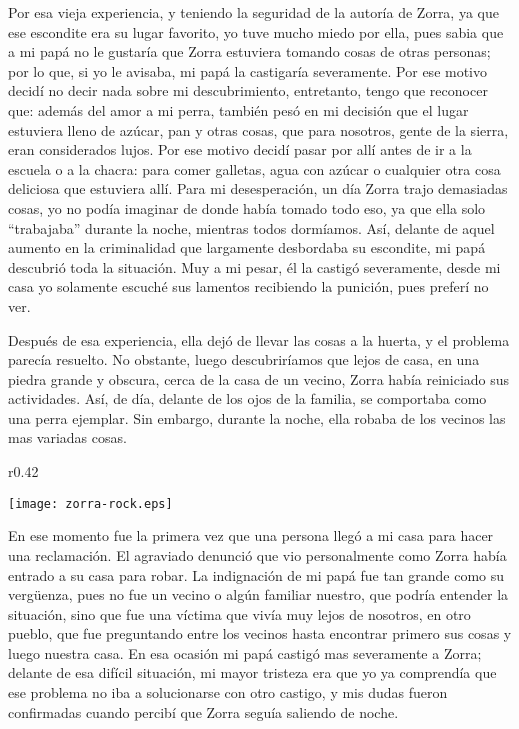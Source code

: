 Por esa vieja experiencia, y teniendo la seguridad de la autoría de Zorra, ya que ese escondite era su lugar favorito, yo tuve mucho miedo por ella, pues sabia que a mi papá no le gustaría que Zorra estuviera tomando cosas de otras personas; por lo que, si yo le avisaba, mi papá la castigaría severamente. Por ese motivo decidí no decir nada sobre mi descubrimiento, entretanto, tengo que reconocer que: además del amor a mi perra, también pesó en mi decisión que el lugar estuviera lleno de azúcar, pan y otras cosas, que para nosotros, gente de la sierra, eran considerados lujos.
Por ese motivo decidí pasar por allí antes de ir a la escuela o a la chacra: para comer galletas, agua con azúcar o cualquier otra cosa deliciosa que estuviera allí.
Para mi desesperación, un día Zorra trajo demasiadas cosas, yo no podía imaginar de donde había tomado todo eso, ya que ella solo ``trabajaba'' durante la noche, mientras todos dormíamos. Así, delante de aquel aumento en la criminalidad que largamente desbordaba su escondite, mi papá descubrió toda la situación.
Muy a mi pesar, él la castigó severamente, desde mi casa yo solamente escuché sus lamentos recibiendo la punición, pues preferí no ver.


Después de esa experiencia, ella dejó de llevar las cosas a la huerta, y el problema parecía resuelto. No obstante, luego descubriríamos que lejos de casa, en una piedra grande y obscura, cerca de la casa de un vecino, 
Zorra había reiniciado sus actividades. Así, de día, delante de los ojos de la familia, se comportaba como una perra ejemplar. Sin embargo, durante la noche, ella robaba de los vecinos las mas variadas cosas.

\ifdefined\EnableIncludeImages
\begin{wrapfigure}{r}{0.42\textwidth}
  \begin{center}
  \vspace{-10pt}
    \texttt{[image: zorra-rock.eps]}
  \end{center}
  \vspace{-20pt}
\end{wrapfigure}
\fi
En ese momento fue la primera vez que una persona llegó a mi casa para hacer una reclamación. El agraviado denunció que vio personalmente como Zorra había entrado a su casa para robar.
La indignación de mi papá fue tan grande como su vergüenza, pues no fue un vecino o algún familiar nuestro, que podría entender la situación, sino que fue una víctima que vivía muy lejos de nosotros, en otro pueblo, que fue preguntando entre los vecinos hasta encontrar primero sus cosas y luego nuestra casa.
En esa ocasión mi papá castigó mas severamente a Zorra; delante de esa difícil situación, mi mayor tristeza era que yo ya comprendía que ese problema no iba a solucionarse con otro castigo, y mis dudas fueron confirmadas cuando percibí que Zorra seguía saliendo de noche.

